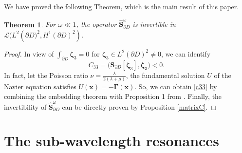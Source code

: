 \documentclass[10pt,reqno,oneside]{amsart}%
\newtheorem{thm}{Theorem}[section]
\theoremstyle{definition}
\theoremstyle{remark}
\numberwithin{equation}{section}
\numberwithin{equation}{section}
\begin{document}
We have proved the following Theorem, which is the main result of this paper.
\begin{thm}
For $\omega\ll1$, the operator $\hat{\mathbf{S}}_{\partial D}^{\omega}$ is invertible in $\mathcal{L}(L^{2}\left(\partial D)^{2},H^{1}(\partial D)^{2}\right)$.%
\end{thm}
\begin{proof}
In view of $\int_{\partial D}\boldsymbol{\zeta}_3=0$ for $\boldsymbol{\zeta}_3\in L^{2}\left(\partial D\right)^{2}\neq0$, we can identify
\begin{equation}\label{c33}
C_{33}=\Big(\mathbf{S}_{\partial D}[\boldsymbol{\zeta}_3],\boldsymbol{\zeta}_3 \Big)<0.
\end{equation}
In fact, let the Poisson ratio $\nu=\frac{\lambda}{2(\lambda+\mu)}$, the fundamental solution $U$ of the Navier equation satisfies $U(\mathbf{x})=-\boldsymbol{\Gamma}(\mathbf{x})$. So, we can obtain \eqref{c33} by combining the embedding theorem with Proposition 1 from \cite{2DelasticInvert}. Finally, the invertibility of $\hat{\mathbf{S}}_{\partial D}^{\omega}$ can be directly proven by
Proposition \ref{matrixC}.
\end{proof}

\section{The sub-wavelength resonances}
\end{document}

